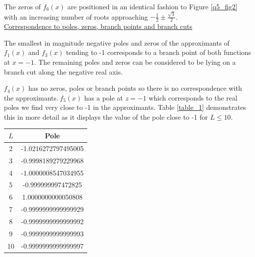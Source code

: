 \documentclass[12pt, a4paper]{article}
\begin{document}
The zeros of $f_{6}(x)$ are positioned in an identical fashion to Figure \ref{q5_fig2} with an increasing 
number of roots approaching $-\frac{1}{2} \pm \frac{\sqrt{3}}{2}$. 
\\

\vspace{0.4cm}
\underline{Correspondence to poles, zeros, branch points and branch cuts}

\vspace{0.5cm}
The smallest in magnitude negative poles and zeros of the approximants of $f_{1}(x)$ and 
$f_{3}(x)$ tending to -1 corresponds to a branch point of both functions at $x=-1$. The 
remaining poles and zeros can be considered to be lying on a branch cut along the negative 
real axis.
\\

\begin{minipage}{0.45\textwidth}
$f_{4}(x)$ has no zeros, poles or branch points so there is no correspondence with the 
approximants.$~f_{5}(x)$ has a pole at $z = -1$ which corresponds to the real poles we 
find very close to -1 in the approximants. Table \ref{table_1} demonstrates this in more 
detail as it displays the value of the pole close to -1 for $L \leq 10$.
\end{minipage}
\hspace{0.05\textwidth}
\begin{minipage}{0.49\textwidth}
	\centering
	\renewcommand{\arraystretch}{1.2}
	\begin{tabular}{|l|l|}
		\hline
		\multicolumn{1}{|c|}{$L$} & \multicolumn{1}{c|}{Pole}               \\ \hline
		\multicolumn{1}{|c|}{2}   & \multicolumn{1}{c|}{-1.0216272797495005} \\ \hline
		\multicolumn{1}{|c|}{3}   & \multicolumn{1}{c|}{-0.9998189279229968} \\ \hline
		\multicolumn{1}{|c|}{4}   & \multicolumn{1}{c|}{-1.0000008547034955} \\ \hline
		\multicolumn{1}{|c|}{5}   & \multicolumn{1}{c|}{-0.999999997472825}  \\ \hline
		\multicolumn{1}{|c|}{6}   & \multicolumn{1}{|c|}{1.0000000000050808}	\\ \hline
		\multicolumn{1}{|c|}{7}   & \multicolumn{1}{|c|}{-0.9999999999999929}   \\ \hline
		\multicolumn{1}{|c|}{8}   & \multicolumn{1}{|c|}{-0.9999999999999992}   \\ \hline
		\multicolumn{1}{|c|}{9}   & \multicolumn{1}{|c|}{-0.9999999999999993}   \\ \hline
		10                        & \multicolumn{1}{|c|}{-0.9999999999999997}   \\ \hline

	\end{tabular}

	\vspace*{-0.2cm}

	\label{table_1}
\end{minipage}
\\
\end{document}
